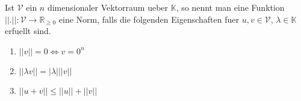 Ist $\mathcal{V}$ ein $n$ dimensionaler Vektorraum ueber $\mathbb{K}$, so nennt man eine Funktion $|| . || : \mathcal{V} \to \mathbb{R}_{\geq 0}$ eine Norm, falls die folgenden Eigenschaften fuer $u,v \in \mathcal{V}$, $\lambda \in \mathbb{K}$ erfuellt sind.
\begin{enumerate}
  \item $|| v || = 0 \iff v = 0^n$
  \item $|| \lambda v || = |\lambda| || v ||$
  \item $|| u + v || \leq || u || + || v ||$ %
\end{enumerate}
